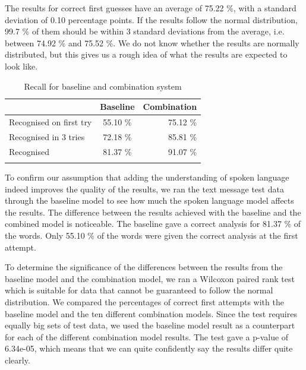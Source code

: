 \documentclass[a4paper,conference]{IEEEtran}
\begin{document}

The results for correct first guesses have an average of 75.22 \%, with a standard deviation of 0.10 percentage points. If the results follow the normal distribution, 99.7 \% of them should be within 3 standard deviations from the average, i.e. between 74.92 \% and 75.52 \%. We do not know whether the results are normally distributed, but this gives us a rough idea of what the results are expected to look like.

\begin{table}[!t]
\caption{Recall for baseline and combination system}
\begin{center}
\begin{tabular} {l c r}
 & Baseline & Combination \\
 \hline
Recognised on first try \rule{0pt}{2.6ex} & 55.10 \% & 75.12 \% \\
Recognised in 3 tries & 72.18 \% & 85.81 \% \\
Recognised & 81.37 \% & 91.07 \% \\
\hline
 & & \\
\end{tabular}
\end{center}
\label{tab:recall}
\end{table}


To confirm our assumption that adding the understanding of spoken language indeed improves the quality of the results, we ran the text message test data through the baseline model to see how much the spoken language model affects the results. The difference between the results achieved with the baseline and the combined model is noticeable. The baseline gave a correct analysis for 81.37 \% of the words. Only 55.10 \% of the words were given the correct analysis at the first attempt.



To determine the significance of the differences between the results from the baseline model and the combination model, we ran a Wilcoxon paired rank test which is suitable for data that cannot be guaranteed to follow the normal distribution. We compared the percentages of correct first attempts with the baseline model and the ten different combination models. Since the test requires equally big sets of test data, we used the baseline model result as a counterpart for each of the different combination model results. The test gave a p-value of 6.34e-05, which means that we can quite confidently say the results differ quite clearly.
\end{document}
